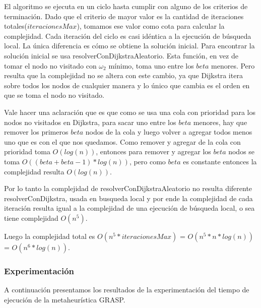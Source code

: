 El algoritmo se ejecuta en un ciclo hasta cumplir con alguno de los criterios de terminación. Dado que el criterio de mayor valor es la cantidad de iteraciones totales($iteracionesMax$), tomamos ese valor como cota para calcular la complejidad.
Cada iteración del ciclo es casi idéntica a la ejecución de búsqueda local. La única diferencia es cómo se obtiene la solución inicial. Para encontrar la solución inicial se usa resolverConDijkstraAleatorio. Esta función, en vez de tomar el nodo no visitado con $\omega_2$ mínimo, toma uno entre los $beta$ menores. Pero resulta que la complejidad no se altera con este cambio, ya que Dijkstra itera sobre todos los nodos de cualquier manera y lo único que cambia es el orden en que se toma el nodo no visitado. 

Vale hacer una aclaración que es que como se usa una cola con prioridad para los nodos no visitados en Dijkstra, para sacar uno entre los $beta$ menores, hay que remover los primeros $beta$ nodos de la cola y luego volver a agregar todos menos uno que es con el que nos quedamos. Como remover y agregar de la cola con prioridad toma $O(log(n))$, entonces para remover y agregar los $beta$ nodos se toma $O((beta + beta-1) * log(n))$, pero como $beta$ es constante entonces la complejidad resulta $O(log(n))$. 

Por lo tanto la complejidad de resolverConDijkstraAleatorio no resulta diferente resolverConDijkstra, usada en busqueda local y por ende la complejidad de cada iteración resulta igual a la complejidad de una ejecución de búsqueda local, o sea tiene complejidad $O(n^5)$.

Luego la complejidad total es $O(n^5 * iteracionesMax)$ = $O(n^5 * n*log(n))$ = $O(n^6 * log(n))$.

\subsubsection{Experimentación}

A continuación presentamos los resultados de la experimentación del tiempo de ejecución de la metaheurística GRASP.

